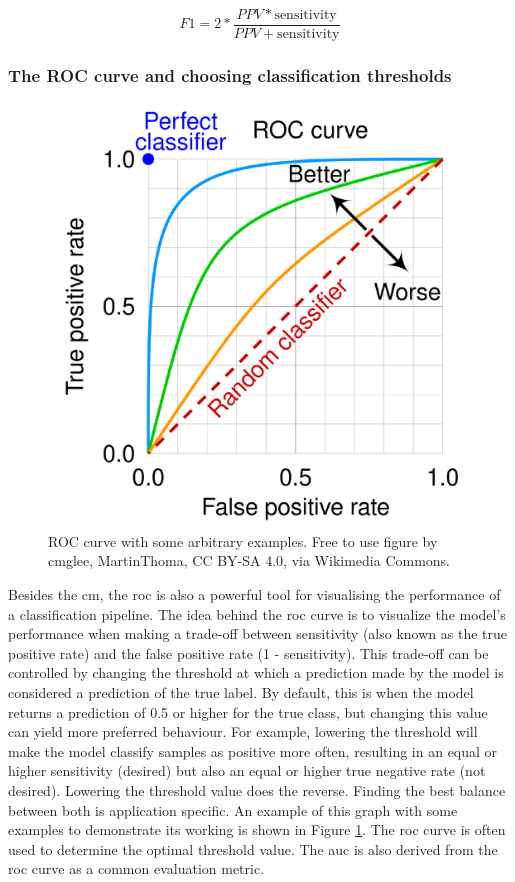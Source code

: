 \begin{equation}
    F1 = 2 * \frac{PPV * \text{sensitivity}}{PPV + \text{sensitivity}}
    \label{eq:processing_signals_f1}
\end{equation}


\subsubsection{The ROC curve and choosing classification thresholds}
\label{subsubsec:processing_signals_evaluating_and_using_evaluation_risk} 

\begin{figure}[t]
    \centering
    \includegraphics[width=0.6\linewidth]{../images/pipeline/ROC.pdf}
    \captionsetup{width=0.7\linewidth}
    \captionsetup{justification=centering}
    \caption{ROC curve with some arbitrary examples. Free to use figure by cmglee, MartinThoma, CC BY-SA 4.0, via Wikimedia Commons.}
    \label{fig:processing_signals_roc_explained}
\end{figure}

Besides the \gls{cm}, the \gls{roc} is also a powerful tool for visualising the performance of a classification pipeline.
The idea behind the \gls{roc} curve is to visualize the model's performance when making a trade-off between sensitivity (also known as the true positive rate) and the false positive rate (1 - sensitivity).
This trade-off can be controlled by changing the threshold at which a prediction made by the model is considered a prediction of the true label.
By default, this is when the model returns a prediction of 0.5 or higher for the true class, but changing this value can yield more preferred behaviour.
For example, lowering the threshold will make the model classify samples as positive more often, resulting in an equal or higher sensitivity (desired) but also an equal or higher true negative rate (not desired).
Lowering the threshold value does the reverse.
Finding the best balance between both is application specific.
An example of this graph with some examples to demonstrate its working is shown in Figure \ref{fig:processing_signals_roc_explained}.
The \gls{roc} curve is often used to determine the optimal threshold value.
The \gls{auc} is also derived from the \gls{roc} curve as a common evaluation metric.


